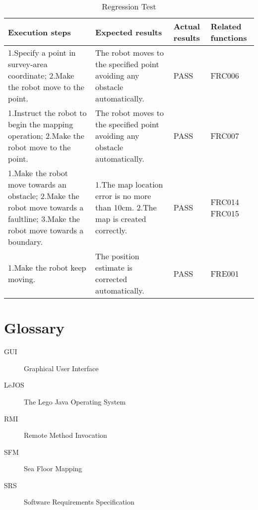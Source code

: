 \documentclass[12pt]{article}
\begin{document}
\begin{table}[H]
\begin{tabular}{ | p{}| p{}| p{}|p{}| }
\hline
\textbf \textbf{Execution steps} &  \textbf\textbf{Expected results} &  \textbf\textbf{Actual results} &  \textbf\textbf{Related functions}  \\
\hline

1.Specify a point in survey-area coordinate;
2.Make the robot move to the point. & The robot moves to the specified point avoiding any obstacle automatically.& PASS  &FRC006\\
\hline

1.Instruct the robot to begin the mapping operation;
2.Make the robot move to the point. &The robot moves to the specified point avoiding any obstacle automatically.& PASS  &FRC007\\
\hline

1.Make the robot move towards an obstacle;
2.Make the robot move towards a faultline;
3.Make the robot move towards a boundary.&1.The map location error is no more than 10cm.
2.The map is created correctly.& PASS &FRC014 FRC015\\
\hline

1.Make the robot keep moving. &The position estimate is corrected automatically.& PASS &FRE001\\
\hline

\end{tabular}
\caption{Regression Test}\label{table:regression}
\end{table} 


\section{Glossary}

\begin{description}
\item [{GUI}] Graphical User Interface 
\item [{LeJOS}] The Lego Java Operating System 
\item [{RMI}] Remote Method Invocation 
\item [{SFM}] Sea Floor Mapping 
\item [{SRS}] Software Requirements Specification 

\end{description}
\end{document}
